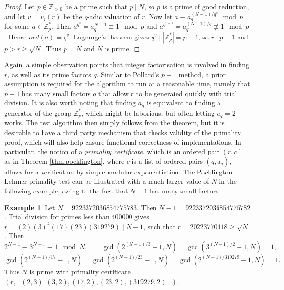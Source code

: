 \documentclass{article}
\newcommand{\Z}{\mathbb{Z}}
\newcommand{\rb}[1]{\left( #1 \right)}
\renewcommand{\sb}[1]{\left[ #1 \right]}
\newcommand{\abs}[1]{\left\lvert #1 \right\rvert}
\theoremstyle{definition}\newtheorem*{definition}{Definition}
\theoremstyle{definition}\newtheorem*{example}{Example}
\theoremstyle{definition}\newtheorem*{remark}{Remark}
\begin{document}
\begin{proof}
Let $ p \in \Z_{> 0} $ be a prime such that $ p \mid N $, so $ p $ is a prime of good reduction, and let $ v = v_q\rb{r} $ be the $ q $-adic valuation of $ r $. Now let $ a \equiv a_q^{\rb{N - 1} / q^v} \mod p $ for some $ a \in \Z_p^* $. Then $ a^{q^v} = a_q^{N - 1} \equiv 1 \mod p $ and $ a^{q^{v - 1}} = a_q^{\rb{N - 1} / q} \not\equiv 1 \mod p $. Hence $ ord\rb{a} = q^v $. Lagrange's theorem gives $ q^v \mid \abs{\Z_p^*} = p - 1 $, so $ r \mid p - 1 $ and $ p > r \ge \sqrt{N} $. Thus $ p = N $ and $ N $ is prime.
\end{proof}

Again, a simple observation points that integer factorisation is involved in finding $ r $, as well as its prime factors $ q $. Similar to Pollard's $ p - 1 $ method, a prior assumption is required for the algorithm to run at a reasonable time, namely that $ p - 1 $ has many small factors $ q $ that allow $ r $ to be generated quickly with trial division. It is also worth noting that finding $ a_q $ is equivalent to finding a generator of the group $ \Z_p^* $, which might be laborious, but often letting $ a_q = 2 $ works. The test algorithm then simply follows from the theorem, but it is desirable to have a third party mechanism that checks validity of the primality proof, which will also help ensure functional correctness of implementations. In particular, the notion of a \emph{primality certificate}, which is an ordered pair $ \rb{r, c} $ as in Theorem \ref{thm:pocklington}, where $ c $ is a list of ordered pairs $ \rb{q, a_q} $, allows for a verification by simple modular exponentiation. The Pocklington-Lehmer primality test can be illustrated with a much larger value of $ N $ in the following example, owing to the fact that $ N - 1 $ has many small factors.

\begin{example}
Let $ N = 9223372036854775783 $. Then $ N - 1 = 9223372036854775782 $. Trial division for primes less than $ 400000 $ gives $ r = \rb{2}\rb{3}^4\rb{17}\rb{23}\rb{319279} \mid N - 1 $, such that $ r = 20223770418 \ge \sqrt{N} $. Then
$$ 2^{N - 1} \equiv 3^{N - 1} \equiv 1 \mod N, \qquad \gcd\rb{2^{\rb{N - 1} / 3} - 1, N} = \gcd\rb{3^{\rb{N - 1} / 2} - 1, N} = 1, $$
$$ \gcd\rb{2^{\rb{N - 1} / 17} - 1, N} = \gcd\rb{2^{\rb{N - 1} / 23} - 1, N} = \gcd\rb{2^{\rb{N - 1} / 319279} - 1, N} = 1. $$
Thus $ N $ is prime with primality certificate $ \rb{r, \sb{\rb{2, 3}, \rb{3, 2}, \rb{17, 2}, \rb{23, 2}, \rb{319279, 2}}} $.
\end{example}
\end{document}
